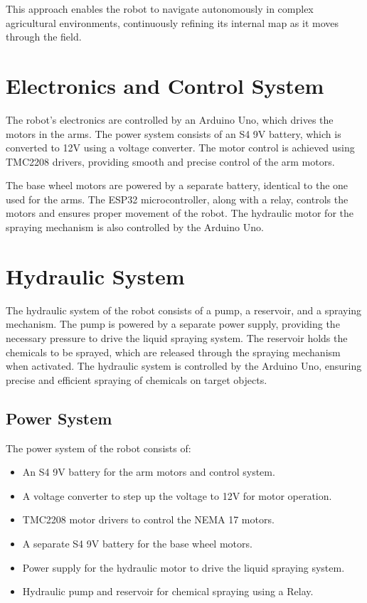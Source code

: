This approach enables the robot to navigate autonomously in complex agricultural environments, continuously refining its internal map as it moves through the field.


\section{Electronics and Control System}

The robot's electronics are controlled by an Arduino Uno, which drives the motors in the arms. The power system consists of an S4 9V battery, which is converted to 12V using a voltage converter. The motor control is achieved using TMC2208 drivers, providing smooth and precise control of the arm motors.

The base wheel motors are powered by a separate battery, identical to the one used for the arms. The ESP32 microcontroller, along with a relay, controls the motors and ensures proper movement of the robot. The hydraulic motor for the spraying mechanism is also controlled by the Arduino Uno.

\section{Hydraulic System}
The hydraulic system of the robot consists of a pump, a reservoir, and a spraying mechanism. The pump is powered by a separate power supply, providing the necessary pressure to drive the liquid spraying system. The reservoir holds the chemicals to be sprayed, which are released through the spraying mechanism when activated. The hydraulic system is controlled by the Arduino Uno, ensuring precise and efficient spraying of chemicals on target objects.

\cite{azghadi2024preciseroboticweedspotspraying}

\subsection{Power System}

The power system of the robot consists of:

\begin{itemize}
    \item An S4 9V battery for the arm motors and control system.
    \item A voltage converter to step up the voltage to 12V for motor operation.
    \item TMC2208 motor drivers to control the NEMA 17 motors.
    \item A separate S4 9V battery for the base wheel motors.
    \item Power supply for the hydraulic motor to drive the liquid spraying system.
    \item Hydraulic pump and reservoir for chemical spraying using a Relay.
\end{itemize}

